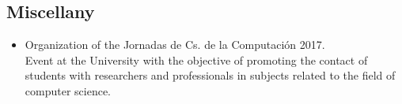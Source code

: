 \documentclass[10pt,a4paper]{moderncv}        %
\begin{document}
  \subsection{Miscellany}
    \begin{itemize}
      \item Organization of the Jornadas de Cs. de la Computaci\'on 2017. \\
      Event at the University with the objective of promoting the contact of students with
      researchers and professionals in subjects related to the field of computer science.
    \end{itemize}

\end{document}
